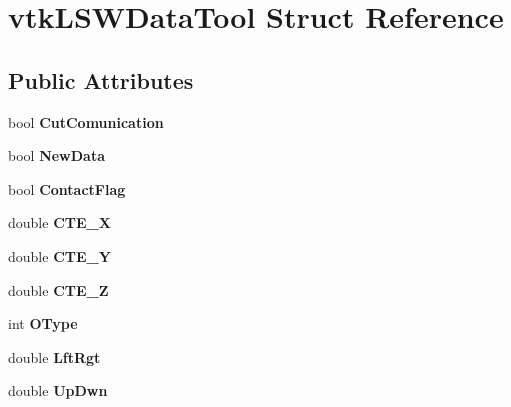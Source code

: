 \hypertarget{structvtkLSWDataTool}{
\section{vtkLSWDataTool Struct Reference}
\label{structvtkLSWDataTool}
}
\subsection*{Public Attributes}
\begin{DoxyCompactItemize}
\item 
\hypertarget{structvtkLSWDataTool_ab1ef71d0f02968b52c01c4d118f3740c}{
bool {\bfseries CutComunication}}
\label{structvtkLSWDataTool_ab1ef71d0f02968b52c01c4d118f3740c}

\item 
\hypertarget{structvtkLSWDataTool_ac476d3803537f5dcb3199024e6c3d1c5}{
bool {\bfseries NewData}}
\label{structvtkLSWDataTool_ac476d3803537f5dcb3199024e6c3d1c5}

\item 
\hypertarget{structvtkLSWDataTool_a44c6b8d067ffcd98f1abc0fc9af4e081}{
bool {\bfseries ContactFlag}}
\label{structvtkLSWDataTool_a44c6b8d067ffcd98f1abc0fc9af4e081}

\item 
\hypertarget{structvtkLSWDataTool_a6bd74db0e0892acfdfd1f3b142779b63}{
double {\bfseries CTE\_\-X}}
\label{structvtkLSWDataTool_a6bd74db0e0892acfdfd1f3b142779b63}

\item 
\hypertarget{structvtkLSWDataTool_afab8a325e115e9a8b493621c9cda3ca6}{
double {\bfseries CTE\_\-Y}}
\label{structvtkLSWDataTool_afab8a325e115e9a8b493621c9cda3ca6}

\item 
\hypertarget{structvtkLSWDataTool_ab0e84855b368f6efdb2826d56a9c1853}{
double {\bfseries CTE\_\-Z}}
\label{structvtkLSWDataTool_ab0e84855b368f6efdb2826d56a9c1853}

\item 
\hypertarget{structvtkLSWDataTool_aa6f7305733227d98bc45a6b2d03b2efb}{
int {\bfseries OType}}
\label{structvtkLSWDataTool_aa6f7305733227d98bc45a6b2d03b2efb}

\item 
\hypertarget{structvtkLSWDataTool_a8297e2134fc214bf019e080e45ac28e4}{
double {\bfseries LftRgt}}
\label{structvtkLSWDataTool_a8297e2134fc214bf019e080e45ac28e4}

\item 
\hypertarget{structvtkLSWDataTool_a6ace25d794dde324d8b1f1e1ddb65cb0}{
double {\bfseries UpDwn}}
\label{structvtkLSWDataTool_a6ace25d794dde324d8b1f1e1ddb65cb0}


\end{DoxyCompactItemize}
